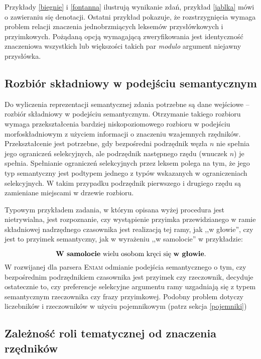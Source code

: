 \documentclass[a4paper, 12pt]{article}
\theoremstyle{remark}
\newcommand{\eniam}{\textsc{Eniam}}
\begin{document}
Przykłady \ref{biegnie} i \ref{fontanna} ilustrują wynikanie zdań, przykład \ref{jablka} mówi o zawieraniu się denotacji.
Ostatni przykład pokazuje, że rozstrzygnięcia wymaga problem relacji znaczenia jednobrzmiących leksemów przysłówkowych i przyimkowych. Pożądaną opcją wymagającą zweryfikowania jest identyczność znaczeniowa wszystkich lub większości takich par \emph{modulo} argument niejawny przysłówka.

\subsection{Rozbiór składniowy w podejściu semantycznym}

Do wyliczenia reprezentacji semantycznej zdania potrzebne są dane wejściowe -- rozbiór składniowy w podejściu semantycznym. Otrzymanie takiego rozbioru wymaga przekształcenia bardziej niskopoziomowego rozbioru w podejściu morfoskładniowym z użyciem informacji o znaczeniu wzajemnych rzędników. Przekształcenie jest potrzebne, gdy bezpośredni podrzędnik węzła $n$ nie spełnia jego ograniczeń selekcyjnych, ale podrzędnik następnego rzędu (wnuczek $n$) je spełnia. Spełnianie ograniczeń selekcyjnych przez leksem polega na tym, że jego typ semantyczny jest podtypem jednego z typów wskazanych w ograniczeniach selekcyjnych. W takim przypadku podrzędnik pierwszego i drugiego rzędu są zamieniane miejscami w drzewie rozbioru.

Typowym przykładem zadania, w którym opisana wyżej procedura jest nietrywialna, jest rozpoznanie, czy wystąpienie przyimka przewidzianego w ramie składniowej nadrzędnego czasownika jest realizacją tej ramy, jak ,,w głowie'', czy jest to przyimek semantyczny, jak w wyrażeniu ,,w samolocie'' w przykładzie:

\begin{equation}
	\text{\textbf{W samolocie} wielu osobom kręci się \textbf{w głowie}.}
\end{equation}
W rozwijanej dla parsera \eniam{} odmianie podejścia semantycznego
o tym, czy bezpośrednim podrzędnikiem czasownika jest przyimek czy rzeczownik,
decyduje ostatecznie to, czy preferencje selekcyjne argumentu ramy uzgadniają się z typem semantycznym rzeczownika czy frazy przyimkowej.
Podobny problem dotyczy liczebników i rzeczowników w użyciu pojemnikowym (patrz sekcja \ref{pojemniki})

\subsection{Zależność roli tematycznej od znaczenia rzędników}
\end{document}
